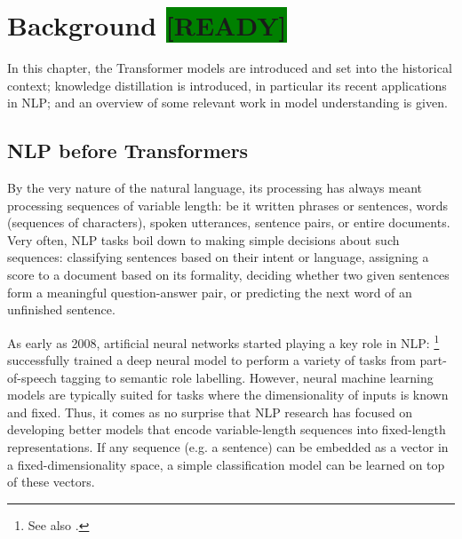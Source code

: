 \documentclass[bsc,frontabs,twoside,singlespacing,parskip,deptreport]{infthesis}
\def\reviewready{\colorbox{green}{[READY]}}
\begin{document}
\chapter{Background \reviewready}{
  \label{ch:background}

  In this chapter, the Transformer models are introduced and set into the historical context; knowledge distillation is introduced, in particular its recent applications in NLP; and an overview of some relevant work in model understanding is given.

  \section{NLP before Transformers}{
    \label{sec:pre-transformer-nlp}
    By the very nature of the natural language, its processing has always meant processing sequences of variable length: be it written phrases or sentences, words (sequences of characters), spoken utterances, sentence pairs, or entire documents.
    Very often, NLP tasks boil down to making simple decisions about such sequences: classifying sentences based on their intent or language, assigning a score to a document based on its formality, deciding whether two given sentences form a meaningful question-answer pair, or predicting the next word of an unfinished sentence.

    As early as 2008, artificial neural networks started playing a key role in NLP: \citet{Collobert_Weston_2008}\footnote{See also \citet{Collobert_Weston_2011}.} successfully trained a deep neural model to perform a variety of tasks from part-of-speech tagging to semantic role labelling.
    However, neural machine learning models are typically suited for tasks where the dimensionality of inputs is known and fixed. Thus, it comes as no surprise that NLP research has focused on developing better models that encode variable-length sequences into fixed-length representations. 
    If any sequence (e.g. a sentence) can be embedded as a vector in a fixed-dimensionality space, a simple classification model can be learned on top of these vectors.
    
}}
\end{document}
